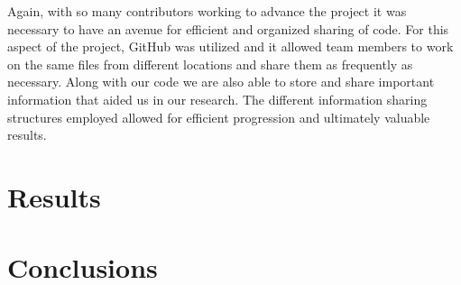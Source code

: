 \documentclass[11pt]{article}
\begin{document}
Again, with so many contributors working to advance the project it was necessary to have an avenue for efficient and organized sharing of code. For this aspect of the project, GitHub was utilized and it allowed team members to work on the same files from different locations and share them as frequently as necessary. Along with our code we are also able to store and share important information that aided us in our research. The different information sharing structures employed allowed for efficient progression and ultimately valuable results. 

\section{Results}
%


\section{Conclusions}





\newpage{}


 
\end{document}
